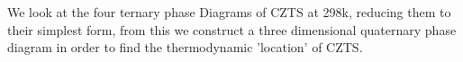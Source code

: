 We look at the four ternary phase Diagrams of CZTS at 298k, reducing them to their simplest form, from this we construct a three dimensional quaternary phase diagram in order to find the thermodynamic 'location' of CZTS.
